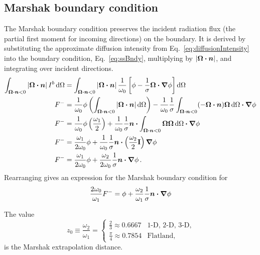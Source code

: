 \subsection{Marshak boundary condition}
The Marshak boundary condition \cite{Mar1947} preserves the incident radiation
flux (the partial first moment for incoming directions) on the boundary. It is
derived by substituting the approximate diffusion
intensity from Eq.~\eqref{eq:diffusionIntensity} into the boundary condition,
Eq.~\eqref{eq:ssBndy}, multiplying by $\left| \bm{\Omega}\bm{\cdot} \bm{n} \right|$, and integrating over
incident directions.
\begin{align*}
\int_{\bm{\Omega}\bm{\cdot} \bm{n} < 0 } \left| \bm{\Omega}\bm{\cdot} \bm{n} \right|
I^b \mathop{}\!\mathrm{d}\Omega
 &= 
\int_{\bm{\Omega}\bm{\cdot} \bm{n} < 0 } \left| \bm{\Omega}\bm{\cdot} \bm{n} \right| 
 \frac{1}{\omega_0} \left[ \phi - \frac{1}{\sigma}
  \bm{\Omega} \bm{\cdot} \bm{\nabla} \phi \right]
  \mathop{}\!\mathrm{d}\Omega
\\
F^{-}
&= 
\frac{1}{\omega_0} \phi \left( \int_{\bm{\Omega}\bm{\cdot} \bm{n} < 0 }
\left| \bm{\Omega}\bm{\cdot} \bm{n} \right| \mathop{}\!\mathrm{d}\Omega \right) 
  - \frac{1}{\omega_0}\frac{1}{\sigma}
  \int_{\bm{\Omega}\bm{\cdot} \bm{n} < 0 } (-\bm{\Omega}\bm{\cdot} \bm{n})
  \bm{\Omega} \mathop{}\!\mathrm{d}\Omega  \bm{\cdot} \bm{\nabla} \phi
\\
F^{-}
&=
\frac{1}{\omega_0} \phi \left( \frac{\omega_1}{2} \right) 
  + \frac{1}{\omega_0}\frac{1}{\sigma} \bm{n} \bm{\cdot}
  \int_{\bm{\Omega}\bm{\cdot} \bm{n} < 0 } \bm{\Omega} \bm{\Omega} \mathop{}\!\mathrm{d}\Omega
  \bm{\cdot} \bm{\nabla} \phi
\\
F^{-}
&=
\frac{\omega_1}{2\omega_0} \phi
+ \frac{1}{\omega_0}\frac{1}{\sigma} \bm{n} \bm{\cdot} \left( \frac{\omega_2}{2}
\mathbf{I} \right) \bm{\nabla} \phi
\\
F^{-}
&=
\frac{\omega_1}{2\omega_0} \phi
+ \frac{\omega_2}{2\omega_0}\frac{1}{\sigma} \bm{n} \bm{\cdot} \bm{\nabla} \phi\,.
\end{align*}
Rearranging gives an expression for the Marshak boundary condition for 
\begin{equation} \label{eq:marshak}
\frac{2\omega_0}{\omega_1} F^{-}
=
\phi + \frac{\omega_2}{\omega_1}\frac{1}{\sigma} \bm{n} \bm{\cdot} \bm{\nabla} \phi
\end{equation}

The value
\begin{equation*}
  z_0 \equiv \frac{\omega_2}{\omega_1}
  =
  \begin{cases}
    \frac{2}{3} \approx 0.6667 & \text{1-D, 2-D, 3-D,} \\
    \frac{\pi}{4} \approx 0.7854 & \text{Flatland,}
  \end{cases}
\end{equation*}
is the Marshak extrapolation distance.

